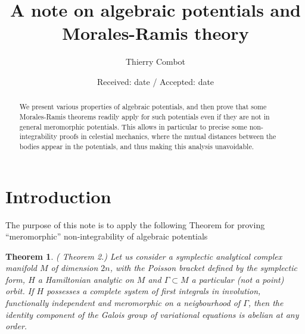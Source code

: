 \documentclass[smallcondensed]{svjour3}
\newtheorem{thm}{Theorem}
\begin{document}
\title{A note on algebraic potentials and Morales-Ramis theory
}


\author{Thierry Combot}



\date{Received: date / Accepted: date}


\maketitle

\begin{abstract}
We present various properties of algebraic potentials, and then prove that some Morales-Ramis theorems readily apply for such potentials even if they are not in general meromorphic potentials. This allows in particular to precise some non-integrability proofs in celestial mechanics, where the mutual distances between the bodies appear in the potentials, and thus making this analysis unavoidable.
\end{abstract}




\section{Introduction}\label{intro}


The purpose of this note is to apply the following Theorem for proving ``meromorphic'' non-integrability of algebraic potentials

\begin{thm}\label{thm:Morales0} (\cite{23} Theorem 2.) Let us consider a symplectic analytical complex manifold $M$ of dimension $2n$, with the Poisson bracket defined by the symplectic form, $H$ a Hamiltonian analytic on $M$ and $\Gamma \subset M$ a particular (not a point) orbit. If $H$ possesses a complete system of first integrals in involution, functionally independent and meromorphic on a neigbourhood of $\Gamma$, then the identity component of the Galois group of variational equations is abelian at any order.
\end{thm}
\end{document}
